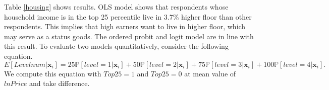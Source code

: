 \documentclass[
  12pt,
]{article}
\begin{document}
Table \ref{housing} shows results. OLS model shows that respondents
whose household income is in the top 25 percentile live in 3.7\% higher
floor than other respondents. This implies that high earners want to
live in higher floor, which may serve as a status goods. The ordered
probit and logit model are in line with this result. To evaluate two
models quantitatively, consider the following equation.
\begin{equation*}
  E[Levelnum | \mathbf{x}_i] = 
  25\mathbb{P}[level = 1| \mathbf{x}_i] + 
  50\mathbb{P}[level = 2| \mathbf{x}_i] + 
  75\mathbb{P}[level = 3| \mathbf{x}_i] + 
  100\mathbb{P}[level = 4| \mathbf{x}_i].
\end{equation*} We compute this equation with \(Top25 = 1\) and
\(Top25 = 0\) at mean value of \(lnPrice\) and take difference.
\end{document}
